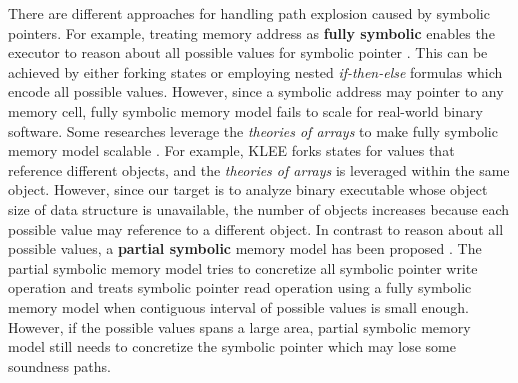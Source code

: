 There are different approaches for handling path explosion caused by
symbolic pointers. For example, treating memory address as \textbf{fully symbolic} 
enables the executor to reason about all possible values for symbolic pointer
\cite{song2008bitblaze, thakur2010directed, brumley2011bap, trtik2014symbolic}.
This can be achieved by either forking states or employing nested 
\textit{if-then-else} formulas which encode all possible values. 
However, since a symbolic address may pointer to any memory cell, fully symbolic
memory model fails to scale for real-world binary software. 
Some researches leverage the \textit{theories of arrays} to make fully symbolic 
memory model scalable \cite{cadar2006exe}\cite{cadar2008klee}. 
For example, KLEE \cite{cadar2008klee} forks states for values that reference 
different objects, and the \textit{theories of arrays} is leveraged within the same object.
However, since our target is to analyze binary executable whose object size of data structure is 
unavailable, the number of objects increases because each possible value may reference to a 
different object.
In contrast to reason about all possible values, a \textbf{partial symbolic} memory model has been proposed \cite{cha2012unleashing, avgerinos2014exploiting, Shoshitaishvili_firmalice-automatic}.  
The partial symbolic memory model tries to concretize all symbolic pointer write 
operation and treats symbolic pointer read operation using a fully 
symbolic memory model when contiguous interval of possible values is small enough.
However, if the possible values spans a large area, partial symbolic memory model
still needs to concretize the symbolic pointer which may lose some soundness paths.


